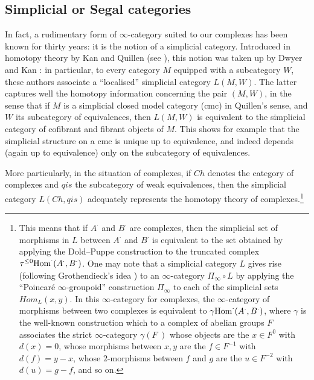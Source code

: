 \subsection*{Simplicial or Segal categories}

In fact, a rudimentary form of $\infty$-category suited to our complexes has
been known for thirty years: it is the notion of a simplicial category.
Introduced in homotopy theory by Kan and Quillen (see \cite{Quillen}), this
notion was taken up by Dwyer and Kan \cite{DwyerKan1} \cite{DwyerKan2}
\cite{DwyerKan3}: in particular, to every category $M$ equipped with a
subcategory $W$, these authors associate a ``localised'' simplicial category
$L(M,W)$. The latter captures well the homotopy information concerning the
pair $(M,W)$, in the sense that if $M$ is a simplicial closed model category
(cmc) in Quillen's sense, and $W$ its subcategory of equivalences, then
$L(M,W)$ is equivalent to the simplicial category of cofibrant and fibrant
objects of $M$. This shows for example that the simplicial structure on a cmc
is unique up to equivalence, and indeed depends (again up to equivalence)
only on the subcategory of equivalences.

More particularly, in the situation of complexes, if $Ch$ denotes the
category of complexes and $qis$ the subcategory of weak equivalences, then
the simplicial category $L(Ch, qis)$ adequately represents the homotopy
theory of complexes.\footnote{This means that if $A^{\cdot}$ and $B^{\cdot}$
are complexes, then the simplicial set of morphisms in $L$ between
$A^{\cdot}$ and $B^{\cdot}$ is equivalent to the set obtained by applying the
Dold--Puppe construction to the truncated complex
$\tau ^{\leq 0}{\rm Hom}^{\cdot}(A^{\cdot}, B^{\cdot})$. One may note that a
simplicial category $L$ gives rise (following Grothendieck's idea
\cite{Grothendieck}) to an $\infty$-category $\Pi _{\infty}\circ L$ by
applying the ``Poincaré $\infty$-groupoid'' construction $\Pi _{\infty}$ to
each of the simplicial sets $Hom _L(x,y)$. In this $\infty$-category for
complexes, the $\infty$-category of morphisms between two complexes is
equivalent to $\gamma {\rm Hom}^{\cdot}(A^{\cdot}, B^{\cdot})$, where
$\gamma$ is the well-known construction which to a complex of abelian groups
$F^{\cdot}$ associates the strict $\infty$-category $\gamma (F^{\cdot})$
whose objects are the $x\in F^0$ with $d(x)=0$, whose morphisms between
$x,y$ are the $f\in F^{-1}$ with $d(f)=y-x$, whose $2$-morphisms between $f$
and $g$ are the $u\in F^{-2}$ with $d(u)=g-f$, and so on.}

